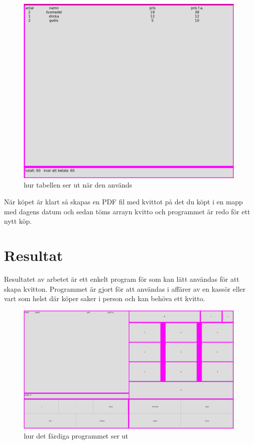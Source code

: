 \documentclass[a4paper, 12pt]{article}
\begin{document}
\begin{figure}[h!]
  \includegraphics[width=\linewidth]{img/kvitto_disp.png}
  \caption{ hur tabellen ser ut när den används}
  \label{fig:kdisp}
\end{figure}

När köpet är klart så skapas en PDF fil med kvittot på det du köpt i en mapp med dagens datum och sedan töms arrayn kvitto och programmet är redo för ett nytt köp.


\section{Resultat}

Resultatet av arbetet är ett enkelt program för som kan lätt användas för att skapa kvitton.
Programmet är gjort för att användas i affärer av en kassör eller vart som helst där köper saker i person och kan behöva ett kvitto.

\begin{figure}[h!]
  \includegraphics[width=\linewidth]{img/ferdig.png}
  \caption{ hur det färdiga programmet ser ut}
  \label{fig:färdig}
\end{figure}
\end{document}
